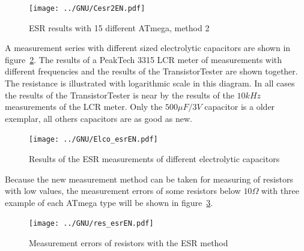 \begin{figure}[H]
\centering
\texttt{[image: ../GNU/Cesr2EN.pdf]}
\caption{ESR results with 15 different ATmega, method 2}
\label{fig:Cesr2}
\end{figure}

A measurement series with different sized electrolytic capacitors are shown in figure~\ref{fig:ElcoESR}.
The results of a PeakTech 3315 LCR meter of measurements with different frequencies and the results of the
TransistorTester are shown together. The resistance is illustrated with logarithmic scale in this diagram. 
In all cases the results of the TransistorTester is near by the results of
the \(10kHz\) measurements of the LCR meter.
Only the \(500\mu F/3V\) capacitor is a older exemplar, all others capacitors are as good as new.

\begin{figure}[H]
\centering
\texttt{[image: ../GNU/Elco\_esrEN.pdf]}
\caption{Results of the ESR measurements of different electrolytic capacitors}
\label{fig:ElcoESR}
\end{figure}


Because the new measurement method can be taken for measuring of resistors with low values, the
measurement errors of some resistors below \(10\Omega\) with three example of each ATmega type will be shown in
figure~\ref{fig:res_esr}. 

\begin{figure}[H]
\centering
\texttt{[image: ../GNU/res\_esrEN.pdf]}
\caption{Measurement errors of resistors with the ESR method}
\label{fig:res_esr}
\end{figure}

